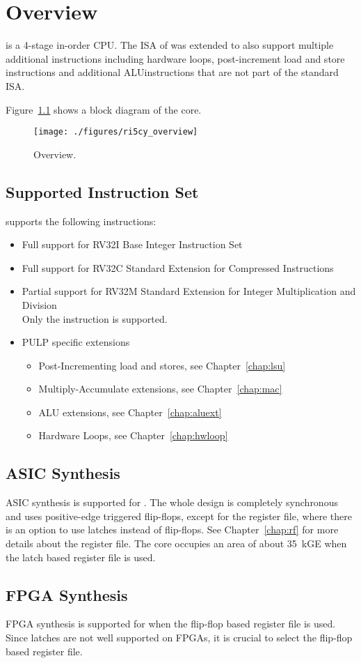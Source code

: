 \chapter{Overview}

\rvcore is a 4-stage in-order \riscv CPU. The ISA of \rvcore was extended to
also support multiple additional instructions including hardware loops,
post-increment load and store instructions and additional ALUinstructions that
are not part of the standard \riscv ISA.

Figure~\ref{fig:ri5cy_overview} shows a block diagram of the core.

\begin{figure}[H]
  \centering
  \texttt{[image: ./figures/ri5cy\_overview]}
  \caption{\rvcore Overview.}
  \label{fig:ri5cy_overview}
\end{figure}


\section{Supported Instruction Set}

\rvcore supports the following instructions:

\begin{itemize}
  \item Full support for RV32I Base Integer Instruction Set
  \item Full support for RV32C Standard Extension for Compressed Instructions
  \item Partial support for RV32M Standard Extension for Integer Multiplication
    and Division \\
        Only the  instruction is supported.
  \item PULP specific extensions \\
        \begin{itemize}
          \item Post-Incrementing load and stores, see Chapter~\ref{chap:lsu}
          \item Multiply-Accumulate extensions, see Chapter~\ref{chap:mac}
          \item ALU extensions, see Chapter~\ref{chap:aluext}
          \item Hardware Loops, see Chapter~\ref{chap:hwloop}
        \end{itemize}
\end{itemize}

\section{ASIC Synthesis}
ASIC synthesis is supported for \rvcore. The whole design is completely
synchronous and uses positive-edge triggered flip-flops, except for the register
file, where there is an option to use latches instead of flip-flops. See
Chapter~\ref{chap:rf} for more details about the register file. The core
occupies an area of about 35~kGE when the latch based register file is used.

\section{FPGA Synthesis}
FPGA synthesis is supported for \rvcore when the flip-flop based register file
is used. Since latches are not well supported on FPGAs, it is crucial to select
the flip-flop based register file.
